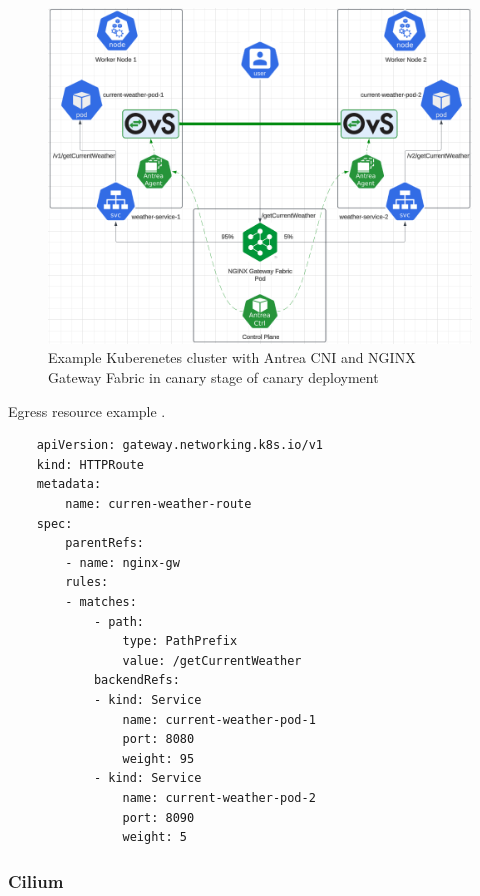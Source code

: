 \begin{figure}[H]
    \centering
    \includegraphics[width=1\columnwidth]{images/antrea-nginx.png}
    \caption{Example Kuberenetes cluster with Antrea CNI and NGINX Gateway Fabric in canary stage of canary deployment}
    \label{fig:canaryAntreaImg}
\end{figure}

\begin{listing}[htb]
    \centering
    \caption{Egress resource example \cite{AntreaEgressArch}.}
    \begin{verbatim}
    apiVersion: gateway.networking.k8s.io/v1
    kind: HTTPRoute
    metadata:
        name: curren-weather-route
    spec:
        parentRefs:
        - name: nginx-gw
        rules:
        - matches:
            - path:
                type: PathPrefix
                value: /getCurrentWeather
            backendRefs:
            - kind: Service
                name: current-weather-pod-1
                port: 8080
                weight: 95
            - kind: Service
                name: current-weather-pod-2
                port: 8090
                weight: 5
    \end{verbatim}
    \label{lst:yamlAntreaIngressCanaryHTTPRoute}
\end{listing}
\subsubsection{Cilium}
\label{subsection:ciliumIngress}

